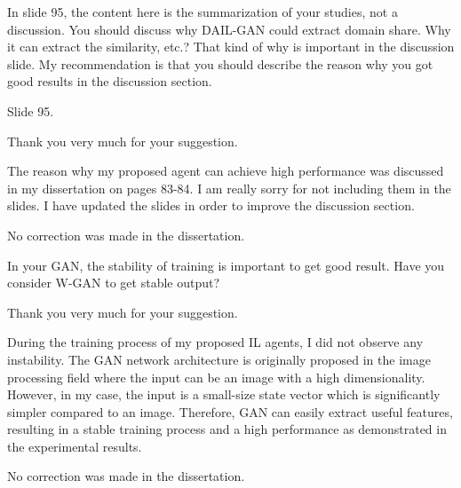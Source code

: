 
\begin{revcomment}
  In slide 95,
  the content here is the summarization of your studies, not a discussion.
  You should discuss why DAIL-GAN could extract domain share.
  Why it can extract the similarity, etc.?
  That kind of why is important in the discussion slide.
  My recommendation is that you should describe the reason why you got good results in the discussion section.

  {Slide 95.}
\end{revcomment}

\begin{revresponse}
  Thank you very much for your suggestion.

  The reason why my proposed agent can achieve high performance was discussed in my dissertation on pages 83-84.
  I am really sorry for not including them in the slides.
  I have updated the slides in order to improve the discussion section.

  \begin{correction}
    No correction was made in the dissertation.
  \end{correction}
\end{revresponse}


\begin{revcomment}
  In your GAN, the stability of training is important to get good result.
  Have you consider W-GAN to get stable output?
\end{revcomment}

\begin{revresponse}
  Thank you very much for your suggestion.

  During the training process of my proposed IL agents, I did not observe any instability.
  The GAN network architecture is originally proposed in the image processing field where the input can be an image with a high dimensionality.
  However, in my case, the input is a small-size state vector which is significantly simpler compared to an image.
  Therefore, GAN can easily extract useful features, resulting in a stable training process and a high performance as demonstrated in the experimental results.

  \begin{correction}
    No correction was made in the dissertation.
  \end{correction}
\end{revresponse}
